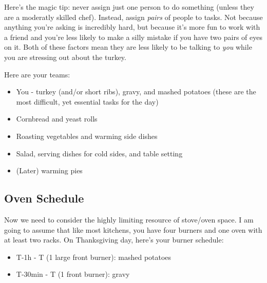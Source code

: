 \documentclass[12pt]{article}
\begin{document}
	Here's the magic tip: never assign just one person to do something (unless they are a moderatly skilled chef). Instead, assign \textit{pairs} of people to tasks. Not because anything you're asking is incredibly hard, but because it's more fun to work with a friend and you're less likely to make a silly mistake if you have two pairs of eyes on it. Both of these factors mean they are less likely to be talking to \textit{you} while you are stressing out about the turkey.
	
	Here are your teams:
	\begin{itemize}
		\item You - turkey (and/or short ribs), gravy, and mashed potatoes (these are the most difficult, yet essential tasks for the day)
		\item Cornbread and yeast rolls
		\item Roasting vegetables and warming side dishes
		\item Salad, serving dishes for cold sides, and table setting
		\item (Later) warming pies
	\end{itemize}
	
	\subsection{Oven Schedule}\label{sec:oven_schedule}
	Now we need to consider the highly limiting resource of stove/oven space. I am going to assume that like most kitchens, you have four burners and one oven with at least two racks. On Thanksgiving day, here's your burner schedule:
	\begin{itemize}
		\item T-1h - T (1 large front burner): mashed potatoes
		\item T-30min - T (1 front burner): gravy
	\end{itemize}
	
\end{document}
